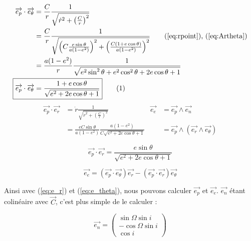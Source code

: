 \documentclass{report}
\begin{document}
\begin{align*}
\overrightarrow{e_p}\cdot\overrightarrow{e_\theta}&=\frac{C}{r}\frac{1}{\sqrt{\dot r^2+\left(\frac{C}{r}\right)^2}}\\
&=\frac{C}{r}\frac{1}{\sqrt{\left(C\frac{e\sin\theta}{a(1-e^2)}\right)^2+\left(\frac{C(1+e\cos\theta)}{a(1-e^2)}\right)^2}}\tag{\ref{eq:rpoint}), (\ref{eq:Artheta}}\\
&=\frac{a(1-e^2)}{r}\frac{1}{\sqrt{e^2\sin^2\theta+e^2\cos^2\theta+2e\cos\theta+1}}\\
\Aboxed{\overrightarrow{e_p}\cdot\overrightarrow{e_\theta}&=\frac{1+e\cos\theta}{\sqrt{e^2+2e\cos\theta+1}}}
\stepcounter{equation}\tag{\theequation}\label{eq:e_pe_theta}
\end{align*}
\begin{align*}
\overrightarrow{e_p}\cdot\overrightarrow{e_r}&=\dot r\frac{1}{\sqrt{\dot r^2+\left(\frac{C}{r}\right)^2}}
&\overrightarrow{e_e}&=\overrightarrow{e_p}\wedge\overrightarrow{e_n}\\
&=\frac{eC\sin\theta}{a(1-e^2)}\frac{a(1-e^2)}{C\sqrt{e^2+2e\cos\theta+1}}&
&=\overrightarrow{e_p}\wedge\left(\overrightarrow{e_r}\wedge\overrightarrow{e_\theta}\right)
\end{align*}

\begin{equation}\boxed{
\overrightarrow{e_p}\cdot\overrightarrow{e_r}=\frac{e\sin\theta}{\sqrt{e^2+2e\cos\theta+1}}}
\label{eq:e_pe_r}
\end{equation}

\begin{equation}\boxed{
\overrightarrow{e_e}=\left(\overrightarrow{e_p}\cdot\overrightarrow{e_\theta}\right)\overrightarrow{e_r}-
\left(\overrightarrow{e_p}\cdot\overrightarrow{e_r}\right)\overrightarrow{e_\theta}}
\label{eq:e_e}
\end{equation}

Ainsi avec (\ref{eq:e_r}) et (\ref{eq:e_theta}), nous pouvons calculer $\overrightarrow{e_p}$ et $\overrightarrow{e_e}$. $\overrightarrow{e_n}$ étant colinéaire avec $\overrightarrow{C}$, c'est plus simple de le calculer :

\begin{equation}\boxed{
\overrightarrow{e_n}=\begin{pmatrix}\sin\Omega\sin i
\\-\cos\Omega\sin i
\\\cos i
\end{pmatrix}}\label{eq:e_n}\end{equation}
\end{document}
